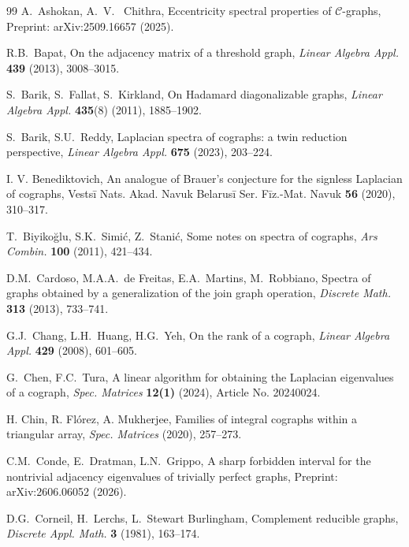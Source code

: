\documentclass[11pt]{article}
\theoremstyle{plain}
\theoremstyle{definition}
\theoremstyle{remark}
\begin{document}
\begin{thebibliography}{99}
		 A.~Ashokan, A.~V.~ Chithra, Eccentricity spectral properties of $\mathcal{C}$-graphs, Preprint: arXiv:2509.16657 (2025).
		
		 R.B.~Bapat, On the adjacency matrix of a threshold graph, \emph{Linear Algebra Appl.} \textbf{439} (2013), 3008--3015.
		
		 S.~Barik, S.~Fallat, S.~Kirkland, On Hadamard diagonalizable graphs, \emph{Linear Algebra Appl.} \textbf{435}(8) (2011), 1885--1902.
		
		 S.~Barik, S.U.~Reddy, Laplacian spectra of cographs: a twin reduction perspective, \emph{Linear Algebra Appl.} \textbf{675} (2023), 203--224.
		
		I. V. Benediktovich,
		An analogue of Brauer's conjecture for the signless Laplacian of cographs, Vestsī Nats. Akad. Navuk Belarusī Ser. Fīz.-Mat. Navuk \textbf{56} (2020), 310--317.
		
		 T.~Biyiko\u{g}lu, S.K.~Simi\'c, Z.~Stani\'c, Some notes on spectra of cographs, \emph{Ars Combin.} \textbf{100} (2011), 421--434.
		
		 D.M.~Cardoso, M.A.A.~de Freitas, E.A.~Martins, M.~Robbiano, Spectra of graphs obtained by a generalization of the join graph operation, \emph{Discrete Math.} \textbf{313} (2013), 733--741.
		
		 G.J.~Chang, L.H.~Huang, H.G.~Yeh, On the rank of a cograph, \emph{Linear Algebra Appl.} \textbf{429} (2008), 601--605.
		
		 G.~Chen, F.C.~Tura, A linear algorithm for obtaining the Laplacian eigenvalues of a cograph, \emph{Spec. Matrices} \textbf{12(1)} (2024), Article No. 20240024.
		
		
		H. Chin, R. Fl\'orez, A. Mukherjee,
		Families of integral cographs within a triangular array, \emph{Spec. Matrices} \textbf{} (2020), 257--273.
		
		 C.M.~Conde, E.~Dratman, L.N.~Grippo, A sharp forbidden interval for the nontrivial adjacency eigenvalues of trivially perfect graphs, Preprint: arXiv:2606.06052 (2026).
		
		 D.G.~Corneil, H.~Lerchs, L.~Stewart Burlingham, Complement reducible graphs, \emph{Discrete Appl. Math.} \textbf{3} (1981), 163--174.
		

\end{thebibliography}
\end{document}
